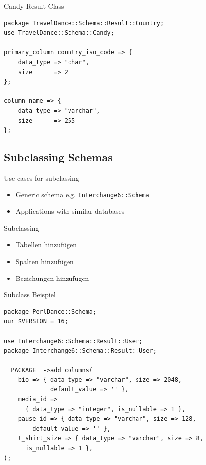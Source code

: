 \begin{frame}[fragile]{Candy Result Class}
\begin{lstlisting}
package TravelDance::Schema::Result::Country;
use TravelDance::Schema::Candy;

primary_column country_iso_code => {
    data_type => "char",
    size      => 2
};

column name => {
    data_type => "varchar",
    size      => 255
};
\end{lstlisting}
\end{frame}

\subsection{Subclassing Schemas}

\begin{frame}[fragile]{Use cases for subclassing}
\begin{itemize}
\item Generic schema e.g. \verb|Interchange6::Schema|
\item Applications with similar databases
\end{itemize}
\end{frame}

\begin{frame}{Subclassing}
\begin{itemize}
\item Tabellen hinzufügen
\item Spalten hinzufügen
\item Beziehungen hinzufügen
\end{itemize}
\end{frame}

\begin{frame}[fragile]{Subclass Beispiel}
\begin{lstlisting}
package PerlDance::Schema;
our $VERSION = 16;

use Interchange6::Schema::Result::User;
package Interchange6::Schema::Result::User;

__PACKAGE__->add_columns(
    bio => { data_type => "varchar", size => 2048, 
             default_value => '' },
    media_id =>
      { data_type => "integer", is_nullable => 1 },
    pause_id => { data_type => "varchar", size => 128, 
        default_value => '' },
    t_shirt_size => { data_type => "varchar", size => 8, 
      is_nullable => 1 },
);
\end{lstlisting}
\end{frame}

